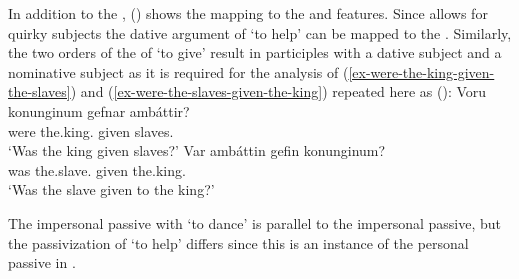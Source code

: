 \ea\label{da-repr-hm-Icelandic-two}%
\z
In addition to the \argstl, () shows the mapping to the \spr and \comps features. Since
 allows for quirky subjects the dative argument of `to help' can be mapped to the
\sprl \citep[--148]{Wechsler95a-u}. Similarly, the two orders of the \argst of `to give' result in participles with a dative
subject and a nominative subject as it is required for the analysis of (\ref{ex-were-the-king-given-the-slaves}) and (\ref{ex-were-the-slaves-given-the-king}) repeated
here as ():
\eal
\ex\label{ex-were-the-king-given-the-slaves-two}
\gll Voru konunginum gefnar ambáttir?\\
     were the.king.\DAT{} given slaves.\NOM{}\\\icelandic
\glt `Was the king given slaves?'
\ex\label{ex-were-the-slaves-given-the-king-two}
\gll Var ambáttin gefin konunginum?\\
     was the.slave.\NOM{} given the.king.\DAT\\
\glt `Was the slave given to the king?'
\zl

\noindent
The impersonal passive with `to dance' is parallel to the  impersonal passive, but the
passivization of `to help' differs since this is an instance of the personal passive in .


